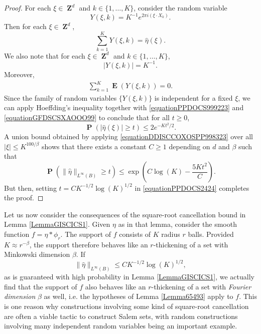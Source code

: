 \documentclass[12pt,reqno]{article}
\numberwithin{equation}{section}
\DeclareMathOperator{\ZZ}{\mathbf{Z}}
\numberwithin{theorem}{section}
\DeclareMathOperator{\EE}{\mathbf{E}}
\DeclareMathOperator{\PP}{\mathbf{P}}
\begin{document}
\begin{proof}
    For each $\xi \in \ZZ^d$ and $k \in \{ 1, \dots, K \}$, consider the random variable
    \[ Y(\xi,k) = K^{-1} e^{2 \pi i (\xi \cdot X_k)}. \]    
    Then for each $\xi \in \ZZ^d$,
    \begin{equation} \label{equationPPDOCS999223}
        \sum_{k = 1}^K Y(\xi,k) = \widehat{\eta}(\xi).
    \end{equation}
    We also note that for each $\xi \in \ZZ^d$ and $k \in \{ 1, \dots, K \}$,
    \begin{equation} \label{equationGFDSCSXAOOO99}
        |Y(\xi,k)| = K^{-1}.
    \end{equation}
    Moreover,
    \begin{equation} \label{equationDOIJWIJCCCCC5555322}
    \begin{split}
        \sum_{k = 1}^K \EE(Y(\xi,k)) = 0.
    \end{split}
    \end{equation}
    Since the family of random variables $\{ Y(\xi,k) \}$ is independent for a fixed $\xi$, we can apply Hoeffding's inequality together with \eqref{equationPPDOCS999223} and \eqref{equationGFDSCSXAOOO99} to conclude that for all $t \geq 0$,
    \begin{equation} \label{equationDDISCCOXOSPP998323}
        \PP \left( |\widehat{\eta}(\xi)| \geq t \right) \leq 2 e^{-Kt^2/2}.
    \end{equation}
    A union bound obtained by applying \eqref{equationDDISCCOXOSPP998323} over all $|\xi| \leq K^{100/\beta}$ shows that there exists a constant $C \geq 1$ depending on $d$ and $\beta$ such that %
    \begin{equation} \label{equationPPDOCS2424}
        \PP \left( \| \widehat{\eta} \|_{L^\infty(B)} \geq t \right) \leq \exp \left( C \log(K) - \frac{5K t^2}{C} \right).
    \end{equation}
    But then, setting $t = CK^{-1/2} \log(K)^{1/2}$ in \eqref{equationPPDOCS2424} completes the proof.
\end{proof}

Let us now consider the consequences of the square-root cancellation bound in Lemma \ref{LemmaGISCICS1}. Given $\eta$ as in that lemma, consider the smooth function $f = \eta * \phi_r$. The support of $f$ consists of $K$ radius $r$ balls. Provided $K \approx r^{-\beta}$, the support therefore behaves like an $r$-thickening of a set with Minkowski dimension $\beta$. If
%
\begin{equation}
    \| \widehat{\eta} \|_{L^\infty(B)} \leq C K^{-1/2} \log(K)^{1/2},
\end{equation}
%
as is guaranteed with high probability in Lemma \ref{LemmaGISCICS1}, we actually find that the support of $f$ also behaves like an $r$-thickening of a set with \emph{Fourier dimension} $\beta$ as well, i.e. the hypotheses of Lemma \ref{Lemma65493} apply to $f$. This is one reason why constructions involving some kind of square-root cancellation are often a viable tactic to construct Salem sets, with random constructions involving many independent random variables being an important example.
\end{document}
